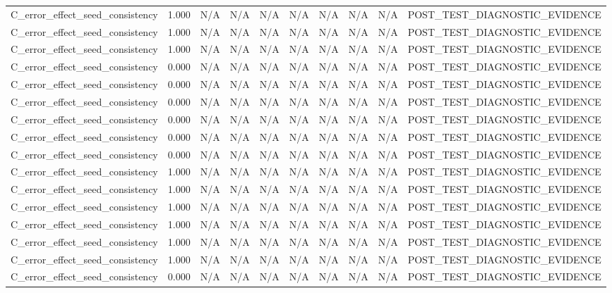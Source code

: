 \begin{table}[h!]
\begin{tabular}{lrrrrrrrrr}
C\_error\_effect\_seed\_consistency & 1.000 & N/A & N/A & N/A & N/A & N/A & N/A & N/A & POST\_TEST\_DIAGNOSTIC\_EVIDENCE \\
C\_error\_effect\_seed\_consistency & 1.000 & N/A & N/A & N/A & N/A & N/A & N/A & N/A & POST\_TEST\_DIAGNOSTIC\_EVIDENCE \\
C\_error\_effect\_seed\_consistency & 1.000 & N/A & N/A & N/A & N/A & N/A & N/A & N/A & POST\_TEST\_DIAGNOSTIC\_EVIDENCE \\
C\_error\_effect\_seed\_consistency & 0.000 & N/A & N/A & N/A & N/A & N/A & N/A & N/A & POST\_TEST\_DIAGNOSTIC\_EVIDENCE \\
C\_error\_effect\_seed\_consistency & 0.000 & N/A & N/A & N/A & N/A & N/A & N/A & N/A & POST\_TEST\_DIAGNOSTIC\_EVIDENCE \\
C\_error\_effect\_seed\_consistency & 0.000 & N/A & N/A & N/A & N/A & N/A & N/A & N/A & POST\_TEST\_DIAGNOSTIC\_EVIDENCE \\
C\_error\_effect\_seed\_consistency & 0.000 & N/A & N/A & N/A & N/A & N/A & N/A & N/A & POST\_TEST\_DIAGNOSTIC\_EVIDENCE \\
C\_error\_effect\_seed\_consistency & 0.000 & N/A & N/A & N/A & N/A & N/A & N/A & N/A & POST\_TEST\_DIAGNOSTIC\_EVIDENCE \\
C\_error\_effect\_seed\_consistency & 0.000 & N/A & N/A & N/A & N/A & N/A & N/A & N/A & POST\_TEST\_DIAGNOSTIC\_EVIDENCE \\
C\_error\_effect\_seed\_consistency & 1.000 & N/A & N/A & N/A & N/A & N/A & N/A & N/A & POST\_TEST\_DIAGNOSTIC\_EVIDENCE \\
C\_error\_effect\_seed\_consistency & 1.000 & N/A & N/A & N/A & N/A & N/A & N/A & N/A & POST\_TEST\_DIAGNOSTIC\_EVIDENCE \\
C\_error\_effect\_seed\_consistency & 1.000 & N/A & N/A & N/A & N/A & N/A & N/A & N/A & POST\_TEST\_DIAGNOSTIC\_EVIDENCE \\
C\_error\_effect\_seed\_consistency & 1.000 & N/A & N/A & N/A & N/A & N/A & N/A & N/A & POST\_TEST\_DIAGNOSTIC\_EVIDENCE \\
C\_error\_effect\_seed\_consistency & 1.000 & N/A & N/A & N/A & N/A & N/A & N/A & N/A & POST\_TEST\_DIAGNOSTIC\_EVIDENCE \\
C\_error\_effect\_seed\_consistency & 1.000 & N/A & N/A & N/A & N/A & N/A & N/A & N/A & POST\_TEST\_DIAGNOSTIC\_EVIDENCE \\
C\_error\_effect\_seed\_consistency & 0.000 & N/A & N/A & N/A & N/A & N/A & N/A & N/A & POST\_TEST\_DIAGNOSTIC\_EVIDENCE \\

\end{tabular}
\end{table}
